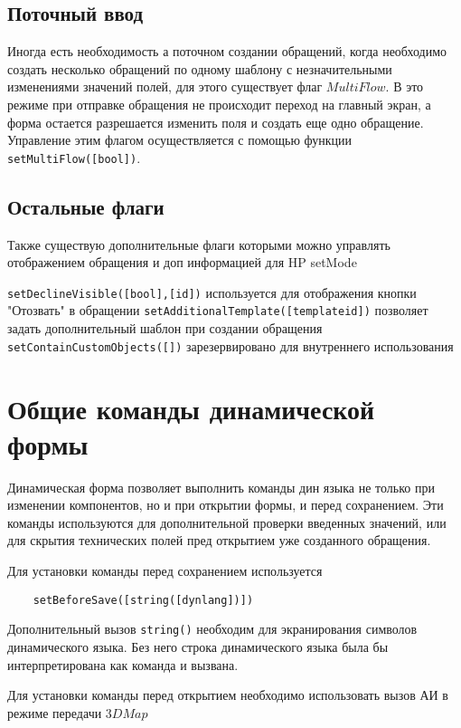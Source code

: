 \documentclass[../index.tex]{subfiles}
\begin{document}
\subsection{Поточный ввод}
Иногда есть необходимость а поточном создании обращений, когда необходимо создать несколько обращений по одному 
шаблону с незначительными изменениями значений полей, для этого существует флаг $MultiFlow$. В это режиме
при отправке обращения не происходит переход на главный экран, а форма остается разрешается изменить поля и 
создать еще одно обращение. Управление этим флагом осуществляется с помощью функции \verb|setMultiFlow([bool])|.

\subsection{Остальные флаги}
Также существую дополнительные флаги которыми можно управлять отображением обращения и доп информацией для HP setMode

\verb|setDeclineVisible([bool],[id])| используется для отображения кнопки "Отозвать" в обращении
\verb|setAdditionalTemplate([templateid])| позволяет задать дополнительный шаблон при создании обращения
\verb|setContainCustomObjects([])| зарезервировано для внутреннего использования

\section{Общие команды динамической формы}
Динамическая форма позволяет выполнить команды дин языка не только при изменении компонентов, но и при открытии формы,
и перед сохранением. Эти команды используются для дополнительной проверки введенных значений, или для скрытия 
технических полей пред открытием уже созданного обращения.

Для установки команды перед сохранением используется
\begin{verbatim}
    setBeforeSave([string([dynlang])])
\end{verbatim}
Дополнительный вызов \verb|string()| необходим для экранирования символов динамического языка. Без него строка динамического языка
была бы интерпретирована как команда и вызвана.

Для установки команды перед открытием необходимо использовать вызов АИ в режиме передачи $3DMap$
\end{document}
